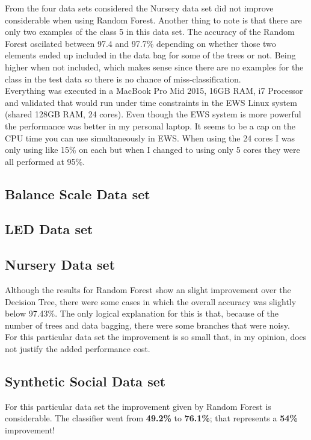 \documentclass[11pt]{article}
\begin{document}
From the four data sets considered the Nursery data set did not improve considerable when using Random Forest. Another thing to note is that there are only two examples of the class 5 in this data set. The accuracy of the Random Forest oscilated between 97.4 and 97.7\% depending on whether those two elements ended up included in the data bag for some of the trees or not. Being higher when not included, which makes sense since there are no examples for the class in the test data so there is no chance of miss-classification. \\

Everything was executed in a MacBook Pro Mid 2015, 16GB RAM, i7 Processor and validated that would run under time constraints in the EWS Linux system (shared 128GB RAM, 24 cores). Even though the EWS system is more powerful the performance was better in my personal laptop. It seems to be a cap on the CPU time you can use simultaneously in EWS. When using the 24 cores I was only using like 15\% on each but when I changed to using only 5 cores they were all performed at 95\%. \\

\subsection*{Balance Scale Data set}

\subsection*{LED Data set}

\subsection*{Nursery Data set}
Although the results for Random Forest show an slight improvement over the Decision Tree, there were some cases in which the overall accuracy was slightly below 97.43\%. The only logical explanation for this is that, because of the number of trees and data bagging, there were some branches that were noisy. \\

For this particular data set the improvement is so small that, in my opinion, does not justify the added performance cost.

\subsection*{Synthetic Social Data set}
For this particular data set the improvement given by Random Forest is considerable. The classifier went from \textbf{49.2\%} to \textbf{76.1\%}; that represents a \textbf{54\%} improvement!
\end{document}

